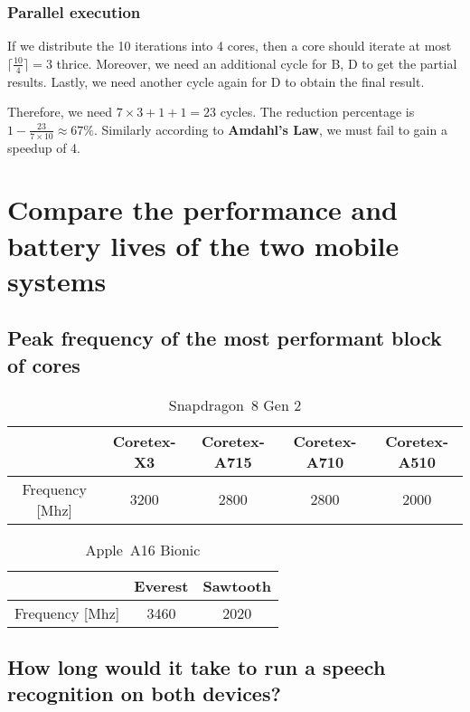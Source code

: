 \documentclass[12pt, a4paper]{article}
\begin{document}
\subsubsection{Parallel execution}

If we distribute the 10 iterations into 4 cores, then a core should iterate at most $\lceil\frac{10}{4}\rceil=3$ thrice. Moreover, we need an additional cycle for B, D to get the partial results. Lastly, we need another cycle again for D to obtain the final result.

Therefore, we need $7\times3+1+1=23$ cycles. The reduction percentage is $1-\frac{23}{7\times10}\approx67\%$. Similarly according to \textbf{Amdahl's Law}, we must fail to gain a speedup of 4.

\section{Compare the performance and battery lives of the two mobile systems}

\subsection{Peak frequency of the most performant block of cores}

\begin{table}[H]
\caption{Snapdragon\textregistered\ 8 Gen 2}
\centering
\begin{tabular}{c||c|c|c|c}
 & Coretex-X3 & Coretex-A715 & Coretex-A710 & Coretex-A510 \\
\hline
Frequency [Mhz] & 3200 & 2800 & 2800 & 2000 \\
\end{tabular}
\label{tab:8gen2}
\end{table}

\begin{table}[H]
\caption{Apple\textregistered\ A16 Bionic}
\centering
\begin{tabular}{c||c|c}
 & Everest & Sawtooth \\
\hline
Frequency [Mhz] & 3460 & 2020 \\
\end{tabular}
\label{tab:8gen2}
\end{table}

\subsection{How long would it take to run a speech recognition on both devices?}
\end{document}
